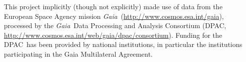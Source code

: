 \documentclass[12pt, modern]{aastex62h}
\newcommand{\acronym}[1]{{\small{#1}}}
\newcommand{\Gaia}{\textsl{Gaia}}
\newcommand{\DPAC}{{\acronym{DPAC}}}
\begin{document}
This project implicitly (though not explicitly) made use of data from
the European Space Agency
mission \Gaia\ (\url{http://www.cosmos.esa.int/gaia}), processed by the
\Gaia\ Data Processing and Analysis Consortium (\DPAC,
\url{http://www.cosmos.esa.int/web/gaia/dpac/consortium}). Funding for the
\DPAC\ has been provided by national institutions, in particular the
institutions participating in the Gaia Multilateral Agreement.


\end{document}
